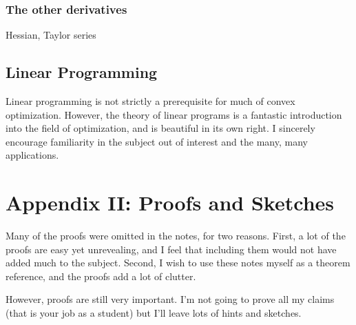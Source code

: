 \documentclass[11pt]{article}
\numberwithin{equation}{section}
\theoremstyle{definition}
\begin{document}
\subsubsection{The other derivatives}
Hessian, Taylor series
\subsection{Linear Programming}
Linear programming is not strictly a prerequisite for much of convex optimization. However, the theory of linear programs is a fantastic introduction into the field of optimization, and is beautiful in its own right. I sincerely encourage familiarity in the subject out of interest and the many, many applications.
\section{Appendix II: Proofs and Sketches}
Many of the proofs were omitted in the notes, for two reasons. First, a lot of the proofs are easy yet unrevealing, and I feel that including them would not have added much to the subject. Second, I wish to use these notes myself as a theorem reference, and the proofs add a lot of clutter.

However, proofs are still very important. I'm not going to prove all my claims (that is your job as a student) but I'll leave lots of hints and sketches.
\end{document}
